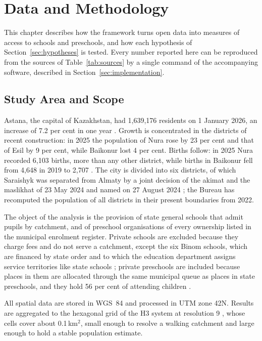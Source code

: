 \chapter{Data and Methodology}
\label{ch:methods}

This chapter describes how the framework turns open data into measures of access to schools and preschools, and how each hypothesis of Section~\ref{sec:hypotheses} is tested. Every number reported here can be reproduced from the sources of Table~\ref{tab:sources} by a single command of the accompanying software, described in Section~\ref{sec:implementation}.

\section{Study Area and Scope}
\label{sec:study-area}

Astana, the capital of Kazakhstan, had 1,639,176 residents on 1 January 2026, an increase of 7.2 per cent in one year \cite{astanapop2026, statages2026}. Growth is concentrated in the districts of recent construction: in 2025 the population of Nura rose by 23 per cent and that of Esil by 9 per cent, while Baikonur lost 4 per cent. Births follow: in 2025 Nura recorded 6,103 births, more than any other district, while births in Baikonur fell from 4,648 in 2019 to 2,707 \cite{statbirths2026}. The city is divided into six districts, of which Saraishyk was separated from Almaty by a joint decision of the akimat and the maslikhat of 23 May 2024 and named on 27 August 2024 \cite{saraishyk2024}; the Bureau has recomputed the population of all districts in their present boundaries from 2022.

The object of the analysis is the provision of state general schools that admit pupils by catchment, and of preschool organisations of every ownership listed in the municipal enrolment register. Private schools are excluded because they charge fees and do not serve a catchment, except the six Binom schools, which are financed by state order and to which the education department assigns service territories like state schools \cite{catchments2026}; private preschools are included because places in them are allocated through the same municipal queue as places in state preschools, and they hold 56 per cent of attending children \cite{indigo2026}.

All spatial data are stored in WGS~84 and processed in UTM zone 42N. Results are aggregated to the hexagonal grid of the H3 system at resolution 9 \cite{h3}, whose cells cover about 0.1\,km$^2$, small enough to resolve a walking catchment and large enough to hold a stable population estimate.

